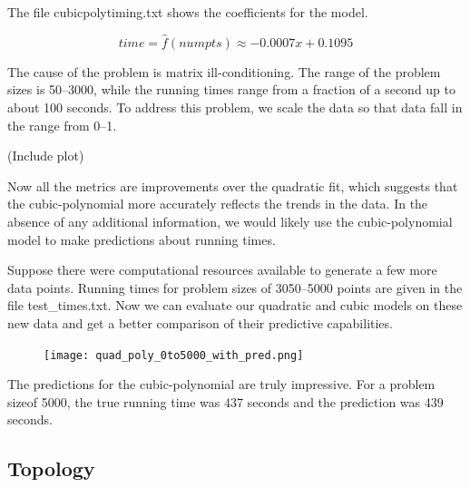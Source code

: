 \documentclass{article}
\begin{document}
The file cubicpolytiming.txt shows the coefficients for the model.




\[ time = \hat{f}(numpts) \approx - 0.0007x + 0.1095 \]

The cause of the problem is matrix ill-conditioning.  The range of the problem sizes is 50--3000, while the running times range from a fraction of a second up to about 100 seconds.  To address this problem, we scale the data so that data fall in the range from 0--1.



(Include plot)

Now all the metrics are improvements over the quadratic fit, which suggests that the cubic-polynomial more accurately reflects the trends in the data.  In the absence of any additional information, we would likely use the cubic-polynomial model to make predictions about running times. 

Suppose there were computational resources available to generate a few more data points.  Running times for problem sizes of 3050--5000 points are given in the file test\_times.txt.  Now we can evaluate our quadratic and cubic models on these new data and get a better comparison of their predictive capabilities.



\begin{centering}
\begin{figure}[htbp]
\texttt{[image: quad\_poly\_0to5000\_with\_pred.png]}
\end{figure}
\end{centering}

The predictions for the cubic-polynomial are truly impressive.  For a problem sizeof 5000, the true running time was 437 seconds and the prediction was 439 seconds.
\subsection{Topology }


\end{document}
